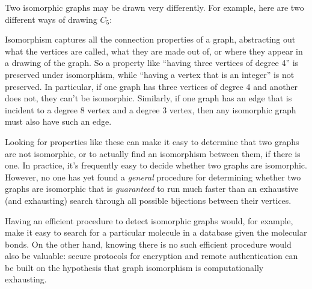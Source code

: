 Two isomorphic graphs may be drawn very differently.  For example, here
are two different ways of drawing $C_5$:


Isomorphism captures all the connection properties of a graph, abstracting
out what the vertices are called, what they are made out of, or where they
appear in a drawing of the graph.  So a property like ``having three
vertices of degree 4'' is preserved under isomorphism, while ``having a
vertex that is an integer'' is not preserved.  In particular, if one graph
has three vertices of degree 4 and another does not, they can't be
isomorphic.  Similarly, if one graph has an edge that is incident to
a degree 8 vertex and a degree 3 vertex, then any isomorphic graph must also
have such an edge.

Looking for properties like these can make it easy to determine that two
graphs are not isomorphic, or to actually find an isomorphism between
them, if there is one.  In practice, it's frequently easy to decide
whether two graphs are isomorphic.  However, no one has yet found a
\emph{general} procedure for determining whether two graphs are isomorphic
that is \emph{guaranteed} to run much faster than an exhaustive (and
exhausting) search through all possible bijections between their
vertices.

Having an efficient procedure to detect isomorphic graphs would, for
example, make it easy to search for a particular molecule in a database
given the molecular bonds.  On the other hand, knowing there is no such
efficient procedure would also be valuable: secure protocols for
encryption and remote authentication can be built on the hypothesis that
graph isomorphism is computationally exhausting.

\begin{problems}
\classproblems
{}

\homeworkproblems
{}
\end{problems}



